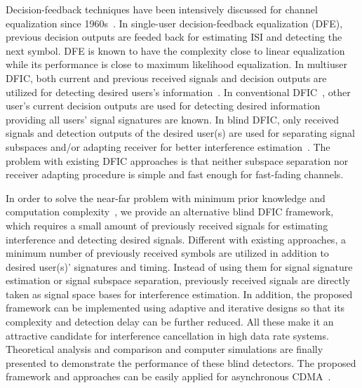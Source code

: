 \documentclass[a4paper,10pt,fleqn, twocolumn]{IEEETran}
\begin{document}
Decision-feedback techniques have been intensively discussed for
channel equalization since 1960s~\cite{Austin67}. In single-user
decision-feedback equalization (DFE), previous decision outputs
are feeded back for estimating ISI and detecting the next symbol.
DFE is known to have the complexity close to linear equalization
while its performance is close to maximum likelihood equalization.
In multiuser DFIC, both current and previous received signals and
decision outputs are utilized for detecting desired users's
information~\cite{Verd98}. In conventional DFIC~\cite{Verd98},
other user's current decision outputs are used for detecting
desired information providing all users' signal signatures are
known. In blind DFIC, only received signals and detection outputs
of the desired user(s) are used for separating signal subspaces
and/or adapting receiver for better interference
estimation~\cite{Madh98,Wang98}. The problem with existing DFIC
approaches is that neither subspace separation nor receiver
adapting procedure is simple and fast enough for fast-fading
channels.

In order to solve the near-far problem with minimum prior
knowledge and computation
complexity~\cite{Wang03d,Wang05A,Wang05B}, we provide an
alternative blind DFIC framework, which requires a small amount of
previously received signals for estimating interference and
detecting desired signals. Different with existing approaches, a
minimum number of previously received symbols are utilized in
addition to desired user(s)' signatures and timing. Instead of
using them for signal signature estimation or signal subspace
separation, previously received signals are directly taken as
signal space bases for interference estimation. In addition, the
proposed framework can be implemented using adaptive and iterative
designs so that its complexity and detection delay can be further
reduced. All these make it an attractive candidate for
interference cancellation in high data rate systems. Theoretical
analysis and comparison and computer simulations are finally
presented to demonstrate the performance of these blind detectors.
The proposed framework and approaches can be easily applied for
asynchronous CDMA~\cite{Wang05A}.
\end{document}

